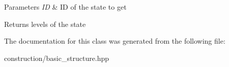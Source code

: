 \begin{DoxyParams}{\-Parameters}
{\em \-I\-D} & \-I\-D of the state to get\\
\hline
\end{DoxyParams}
\begin{DoxyReturn}{\-Returns}
levels of the state 
\end{DoxyReturn}


\-The documentation for this class was generated from the following file\-:\begin{DoxyCompactItemize}
\item 
construction/basic\-\_\-structure.\-hpp\end{DoxyCompactItemize}

